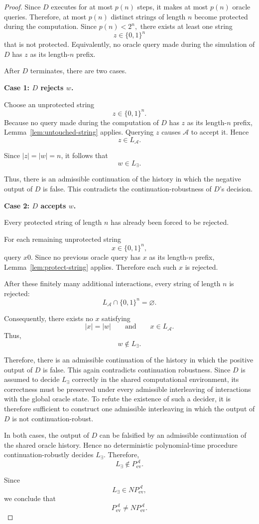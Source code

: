 \documentclass[10pt,a4paper]{amsart}
\begin{document}
\begin{proof}
Since \(D\) executes for at most \(p(n)\) steps, it makes at most
\(p(n)\) oracle queries. Therefore, at most \(p(n)\) distinct strings
of length \(n\) become protected during the computation. Since
\(
p(n)<2^n,
\)
there exists at least one string
\[
z\in\{0,1\}^n
\]
that is not protected. Equivalently, no oracle query made during the
simulation of \(D\) has \(z\) as its length-\(n\) prefix.

After \(D\) terminates, there are two cases.

\medskip

\noindent
\textbf{Case 1: \(D\) rejects \(w\).}

Choose an unprotected string
\[
z\in\{0,1\}^n.
\]
Because no query made during the computation of \(D\) has \(z\) as
its length-\(n\) prefix, Lemma~\ref{lem:untouched-string} applies.
Querying \(z\) causes \(\mathcal A\) to accept it. Hence
\[
z\in L_{\mathcal A}.
\]

Since \(|z|=|w|=n\), it follows that
\[
w\in L_{\exists}.
\]

Thus, there is an admissible continuation of the history in which
the negative output of \(D\) is false. This contradicts the
continuation-robustness of \(D\)'s decision.

\medskip

\noindent
\textbf{Case 2: \(D\) accepts \(w\).}

Every protected string of length \(n\) has already been forced to be
rejected.

For each remaining unprotected string
\[
x\in\{0,1\}^n,
\]
query \(x0\). Since no previous oracle query has \(x\) as its
length-\(n\) prefix, Lemma~\ref{lem:protect-string} applies. Therefore
each such \(x\) is rejected.

After these finitely many additional interactions, every string of
length \(n\) is rejected:
\[
L_{\mathcal A}\cap\{0,1\}^n
=
\varnothing.
\]

Consequently, there exists no \(x\) satisfying
\[
|x|=|w|
\qquad\text{and}\qquad
x\in L_{\mathcal A}.
\]
Thus,
\[
w\notin L_{\exists}.
\]

Therefore, there is an admissible continuation of the history in which the positive output of \(D\) is false. This again contradicts continuation robustness.
Since \(D\) is assumed to decide \(L_{\exists}\) correctly in the shared computational environment, its correctness must be preserved under every admissible interleaving of interactions with the global oracle state. To refute the existence of such a decider, it is therefore sufficient to construct one admissible interleaving in which the output of \(D\) is not continuation-robust.



\medskip

In both cases, the output of \(D\) can be falsified by an admissible
continuation of the shared oracle history. Hence no deterministic
polynomial-time procedure continuation-robustly decides
\(L_{\exists}\). Therefore,
\[
L_{\exists}\notin P_{\mathrm{ev}}^{\mathcal A}.
\]

Since
\[
L_{\exists}\in NP_{\mathrm{ev}}^{\mathcal A},
\]
we conclude that
\[
P_{\mathrm{ev}}^{\mathcal A}
\neq
NP_{\mathrm{ev}}^{\mathcal A}.
\]
\end{proof}
\end{document}

